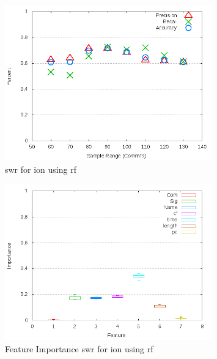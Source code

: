 \clearpage
\begin{figure}[!t]
\centering
\includegraphics[width=0.8\textwidth]{images/rf/test_1/ion_sample_range.png}
\caption{\gls{swr} for ion using \gls{rf}}
\label{fig:test_1_ion_rf}
\end{figure}

\begin{figure}[!t]
\centering
\includegraphics[width=0.8\textwidth]{images/rf/test_1/ion_importance.png}
\caption{Feature Importance \gls{swr} for ion using \gls{rf}}
\label{fig:test_1_ion_rf_importance}
\end{figure}

